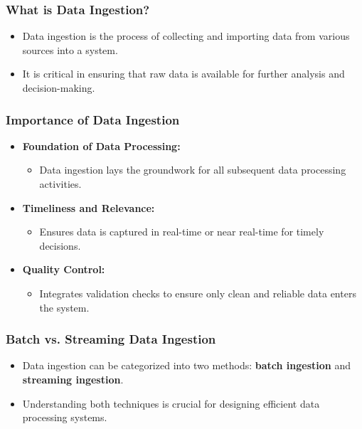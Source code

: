 \documentclass[aspectratio=169]{beamer}
\begin{document}
\frame{\titlepage}

\begin{frame}[fragile]
    \maketitle
\end{frame}

\begin{frame}[fragile]
    \frametitle{What is Data Ingestion?}
    \begin{itemize}
        \item Data ingestion is the process of collecting and importing data from various sources into a system.
        \item It is critical in ensuring that raw data is available for further analysis and decision-making.
    \end{itemize}
\end{frame}

\begin{frame}[fragile]
    \frametitle{Importance of Data Ingestion}
    \begin{itemize}
        \item \textbf{Foundation of Data Processing:} 
        \begin{itemize}
            \item Data ingestion lays the groundwork for all subsequent data processing activities.
        \end{itemize}
        \item \textbf{Timeliness and Relevance:} 
        \begin{itemize}
            \item Ensures data is captured in real-time or near real-time for timely decisions.
        \end{itemize}
        \item \textbf{Quality Control:} 
        \begin{itemize}
            \item Integrates validation checks to ensure only clean and reliable data enters the system.
        \end{itemize}
    \end{itemize}
\end{frame}

\begin{frame}[fragile]
    \frametitle{Batch vs. Streaming Data Ingestion}
    \begin{itemize}
        \item Data ingestion can be categorized into two methods: \textbf{batch ingestion} and \textbf{streaming ingestion}.
        \item Understanding both techniques is crucial for designing efficient data processing systems.
    \end{itemize}
\end{frame}
\end{document}

